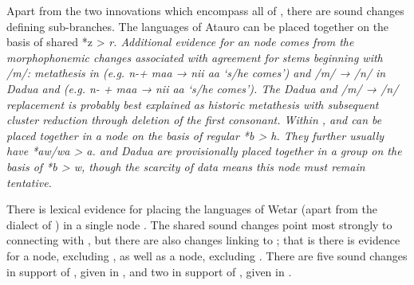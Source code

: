 \clearpage
Apart from the two innovations which encompass all of ,
there are sound changes defining sub-branches.
The languages of Atauro can be placed together on the basis of
shared *z > \it{r.} Additional evidence for an  node
comes from the morphophonemic changes associated with 
agreement for stems beginning with /m/: metathesis in  (e.g.
\it{n-+ maa → nii aa} ‘s/he comes’)
and /m/ → /n/ in Dadu{\Q}a and  (e.g.
 \it{n- + maa → nii aa} ‘s/he comes’).
The Dadu{\Q}a and  /m/ → /n/ replacement is probably
best explained as historic metathesis with subsequent cluster
reduction through deletion of the first consonant.
Within ,  and  can be placed together
in a  node on the basis of regular *b > \it{h}.
They further usually have *aw/wa > \it{a}.
 and Dadu{\Q}a are provisionally placed together in a 
group on the basis of *b > \it{w}, though the scarcity of 
data means this node must remain tentative.

There is lexical evidence for placing the languages of Wetar
(apart from the  dialect of ) in a single 
node \citep{Hinton2000,Taber1993}.
The shared sound changes point most strongly to connecting 
with , but there are also changes linking  to ;
that is there is evidence for a  node,
excluding , as well as a  node, excluding .
There are five sound changes in support of ,
given in , and two in support of , given in .


